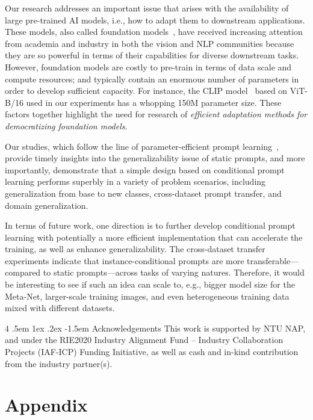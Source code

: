 \documentclass[10pt,twocolumn,letterpaper]{article}
\makeatletter
\renewcommand\paragraph{
  \@startsection{paragraph} %
  {4} %
  {\z@} %
  {.5em \@plus1ex \@minus.2ex} %
  {-1.5em} %
  {\normalfont\normalsize\bfseries} %
}
\makeatother
\begin{document}
Our research addresses an important issue that arises with the availability of large pre-trained AI models, i.e., how to adapt them to downstream applications. These models, also called foundation models~\cite{bommasani2021opportunities}, have received increasing attention from academia and industry in both the vision and NLP communities because they are so powerful in terms of their capabilities for diverse downstream tasks. However, foundation models are costly to pre-train in terms of data scale and compute resources; and typically contain an enormous number of parameters in order to develop sufficient capacity. For instance, the CLIP model~\cite{radford2021learning} based on ViT-B/16 used in our experiments has a whopping 150M parameter size. These factors together highlight the need for research of \emph{efficient adaptation methods for democratizing foundation models}.

Our studies, which follow the line of parameter-efficient prompt learning~\cite{zhou2021coop}, provide timely insights into the generalizability issue of static prompts, and more importantly, demonstrate that a simple design based on conditional prompt learning performs superbly in a variety of problem scenarios, including generalization from base to new classes, cross-dataset prompt transfer, and domain generalization.

In terms of future work, one direction is to further develop conditional prompt learning with potentially a more efficient implementation that can accelerate the training, as well as enhance generalizability. The cross-dataset transfer experiments indicate that instance-conditional prompts are more transferable---compared to static prompts---across tasks of varying natures. Therefore, it would be interesting to see if such an idea can scale to, e.g., bigger model size for the Meta-Net, larger-scale training images, and even heterogeneous training data mixed with different datasets.

\paragraph{Acknowledgements}
This work is supported by NTU NAP, and under the RIE2020 Industry Alignment Fund – Industry Collaboration Projects (IAF-ICP) Funding Initiative, as well as cash and in-kind contribution from the industry partner(s).

\appendix
\section*{Appendix}
\end{document}
